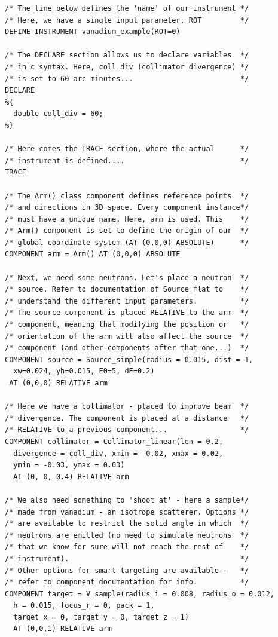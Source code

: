 \begin{verbatim}
/* The line below defines the 'name' of our instrument */
/* Here, we have a single input parameter, ROT         */
DEFINE INSTRUMENT vanadium_example(ROT=0)

/* The DECLARE section allows us to declare variables  */
/* in c syntax. Here, coll_div (collimator divergence) */
/* is set to 60 arc minutes...                         */
DECLARE
%{
  double coll_div = 60;
%}

/* Here comes the TRACE section, where the actual      */
/* instrument is defined....                           */
TRACE

/* The Arm() class component defines reference points  */
/* and directions in 3D space. Every component instance*/
/* must have a unique name. Here, arm is used. This    */
/* Arm() component is set to define the origin of our  */
/* global coordinate system (AT (0,0,0) ABSOLUTE)      */
COMPONENT arm = Arm() AT (0,0,0) ABSOLUTE

/* Next, we need some neutrons. Let's place a neutron  */
/* source. Refer to documentation of Source_flat to    */
/* understand the different input parameters.          */
/* The source component is placed RELATIVE to the arm  */
/* component, meaning that modifying the position or   */
/* orientation of the arm will also affect the source  */
/* component (and other components after that one...)  */
COMPONENT source = Source_simple(radius = 0.015, dist = 1,
  xw=0.024, yh=0.015, E0=5, dE=0.2)
 AT (0,0,0) RELATIVE arm

/* Here we have a collimator - placed to improve beam  */
/* divergence. The component is placed at a distance   */
/* RELATIVE to a previous component...                 */
COMPONENT collimator = Collimator_linear(len = 0.2, 
  divergence = coll_div, xmin = -0.02, xmax = 0.02, 
  ymin = -0.03, ymax = 0.03)
  AT (0, 0, 0.4) RELATIVE arm

/* We also need something to 'shoot at' - here a sample*/
/* made from vanadium - an isotrope scatterer. Options */
/* are available to restrict the solid angle in which  */
/* neutrons are emitted (no need to simulate neutrons  */
/* that we know for sure will not reach the rest of    */
/* instrument).                                        */
/* Other options for smart targeting are available -   */
/* refer to component documentation for info.          */
COMPONENT target = V_sample(radius_i = 0.008, radius_o = 0.012, 
  h = 0.015, focus_r = 0, pack = 1,
  target_x = 0, target_y = 0, target_z = 1)
  AT (0,0,1) RELATIVE arm


\end{verbatim}
